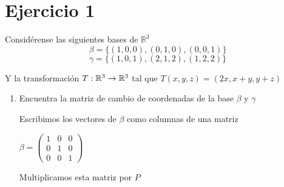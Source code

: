 \section*{Ejercicio 1}

\noindent Considérense las siguientes bases de $\mathbb{R}^{3}$
\begin{equation*}
    \beta = \{ (1,0,0),(0,1,0),(0,0,1) \}
\end{equation*}
\begin{equation*}
    \gamma = \{ (1,0,1),(2,1,2),(1,2,2) \}
\end{equation*}

\noindent Y la transformación $T: \mathbb{R}^{3} \rightarrow \mathbb{R}^{3}$ tal que $T(x,y,z) = (2x,x+y,y+z)$ 
\begin{enumerate}
    \item Encuentra la matriz de cambio de coordenadas de la base $\beta$ y $\gamma$

    \vspace{2mm}

    \noindent \solucion

    \begin{center}
        Escribimos los vectores de $\beta$ como columnas de una matriz

        \vspace{5mm}

        $
        \beta = 
            \begin{pmatrix}
                1 & 0 & 0 \\
                0 & 1 & 0 \\
                0 & 0 & 1
            \end{pmatrix}
        $
        \vspace{5mm}

        Multiplicamos esta matriz por $P$

        \vspace{5mm}


\end{center}
\end{enumerate}
